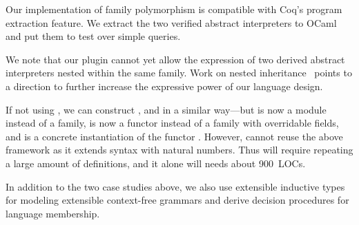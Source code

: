 Our implementation of family polymorphism is compatible with Coq's
program extraction feature.
We extract the two verified abstract interpreters to OCaml
and put them to test over simple queries. %

We note that our plugin cannot yet allow the expression of two derived abstract
interpreters nested within the same family.
Work on nested inheritance~\cite{ncm2004,zm2017} points to a direction
to further increase the expressive power of our language design.

If not using \Lang, we can construct ,  and  in a similar way---but  is now a module instead of a family,  is now a functor instead of a family with overridable fields, and  is a concrete instantiation of the functor . However,  cannot reuse the above framework as it extends syntax with natural numbers. Thus  will require repeating a large amount of definitions, and it alone will needs about 900~LOCs.

In addition to the two case studies above, we also use extensible
inductive types for modeling extensible context-free grammars and derive
decision procedures for language membership.

